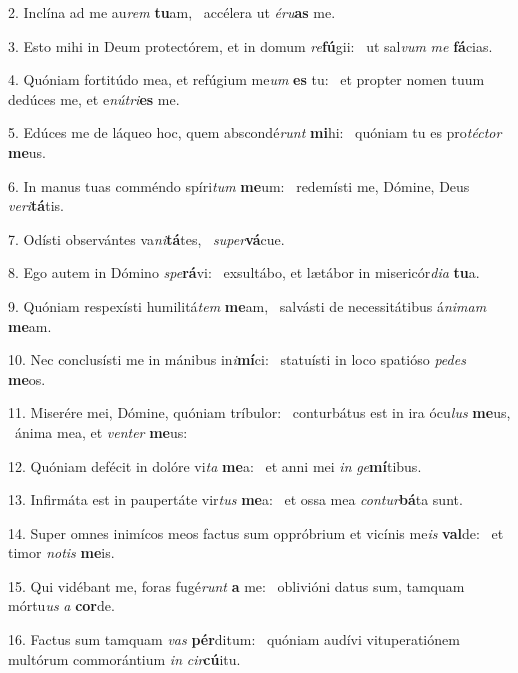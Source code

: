 2. Inclína ad me au\textit{rem} \textbf{tu}am, \ast\  accélera ut \textit{é}\textit{ru}\textbf{as} me.\

3. Esto mihi in Deum protectórem, et in domum \textit{re}\textbf{fú}gii: \ast\  ut sal\textit{vum} \textit{me} \textbf{fá}cias.\

4. Quóniam fortitúdo mea, et refúgium me\textit{um} \textbf{es} tu: \ast\  et propter nomen tuum dedúces me, et e\textit{nú}\textit{tri}\textbf{es} me.\

5. Edúces me de láqueo hoc, quem abscondé\textit{runt} \textbf{mi}hi: \ast\  quóniam tu es pro\textit{téc}\textit{tor} \textbf{me}us.\

6. In manus tuas comméndo spíri\textit{tum} \textbf{me}um: \ast\  redemísti me, Dómine, Deus \textit{ve}\textit{ri}\textbf{tá}tis.\

7. Odísti observántes va\textit{ni}\textbf{tá}tes, \ast\  \textit{su}\textit{per}\textbf{vá}cue.\

8. Ego autem in Dómino \textit{spe}\textbf{rá}vi: \ast\  exsultábo, et lætábor in misericór\textit{di}\textit{a} \textbf{tu}a.\

9. Quóniam respexísti humilitá\textit{tem} \textbf{me}am, \ast\  salvásti de necessitátibus á\textit{ni}\textit{mam} \textbf{me}am.\

10. Nec conclusísti me in mánibus in\textit{i}\textbf{mí}ci: \ast\  statuísti in loco spatióso \textit{pe}\textit{des} \textbf{me}os.\

11. Miserére mei, Dómine, quóniam tríbulor: \dag\  conturbátus est in ira ócu\textit{lus} \textbf{me}us, \ast\  ánima mea, et \textit{ven}\textit{ter} \textbf{me}us:\

12. Quóniam defécit in dolóre vi\textit{ta} \textbf{me}a: \ast\  et anni mei \textit{in} \textit{ge}\textbf{mí}tibus.\

13. Infirmáta est in paupertáte vir\textit{tus} \textbf{me}a: \ast\  et ossa mea \textit{con}\textit{tur}\textbf{bá}ta sunt.\

14. Super omnes inimícos meos factus sum oppróbrium et vicínis me\textit{is} \textbf{val}de: \ast\  et timor \textit{no}\textit{tis} \textbf{me}is.\

15. Qui vidébant me, foras fugé\textit{runt} \textbf{a} me: \ast\  oblivióni datus sum, tamquam mórtu\textit{us} \textit{a} \textbf{cor}de.\

16. Factus sum tamquam \textit{vas} \textbf{pér}ditum: \ast\  quóniam audívi vituperatiónem multórum commorántium \textit{in} \textit{cir}\textbf{cú}itu.\

